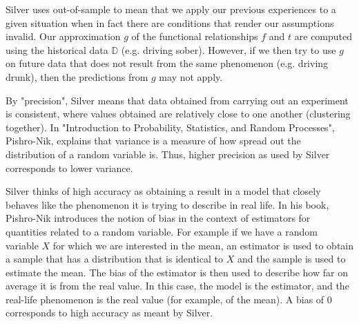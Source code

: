 \documentclass[12pt]{article}
\begin{document}
\begin{enumerate}
Silver uses out-of-sample to mean that we apply our previous experiences to a given
situation when in fact there are conditions that render our assumptions invalid.
Our approximation $g$ of the functional relationships $f$ and $t$ are computed using
the historical data $\mathbb{D}$ (e.g. driving sober). However, if we
then try to use $g$ on future data that does not result from the same phenomenon
(e.g. driving drunk), then the predictions from $g$ may not apply.


By "precision", Silver means that data obtained from carrying out an experiment is consistent,
where values obtained are relatively close to one another (clustering together).
In "Introduction to Probability, Statistics, and Random Processes", Pishro-Nik,
explains that variance is a measure of how spread out the distribution of a random variable
is. Thus, higher precision as used by Silver corresponds to lower variance.

Silver thinks of high accuracy as obtaining a result in a model that closely behaves
like the phenomenon it is trying to describe in real life. In his book, Pishro-Nik
introduces the notion of bias in the context of estimators for quantities related to
a random variable. For example if we have a random variable $X$ for which we are
interested in the mean, an estimator is used to obtain a sample that has a distribution
that is identical to $X$ and the sample is used to estimate the mean. The bias of the
estimator is then used to describe how far on average it is from the real value.
In this case, the model is the estimator, and the real-life phenomenon is the real value
(for example, of the mean). A bias of $0$ corresponds to high accuracy as meant by Silver.

\end{enumerate}


\end{document}
